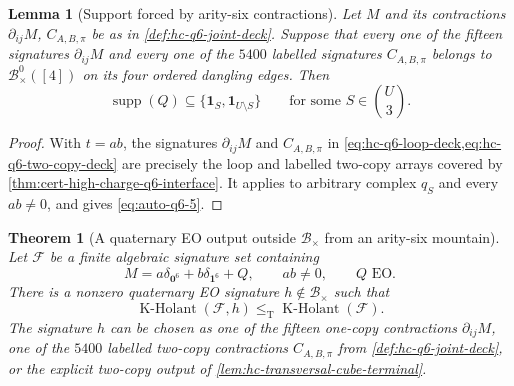 \documentclass[11pt,letterpaper,onecolumn]{article}
\theoremstyle{plain}
\newtheorem{theorem}{Theorem}[section]
\newtheorem{lemma}[lemma]{Lemma}
\theoremstyle{definition}
\theoremstyle{remark}
\newcommand{\cF}{\mathcal F}
\newcommand{\KHolant}{\operatorname{K\text{-}Holant}}
\newcommand{\one}{\mathbf 1}
\newcommand{\zero}{\mathbf 0}
\newcommand{\leT}{\leq_{\mathrm T}}
\begin{document}
	\begin{lemma}[Support forced by arity-six contractions]
		\label{lem:hc-q6-joint-rigidity}
		Let \(M\) and its contractions \(\partial_{ij}M\), \(C_{A,B,\pi}\) be as in
		\cref{def:hc-q6-joint-deck}.  Suppose that every one of the fifteen
		signatures \(\partial_{ij}M\) and every one of the \(5400\) labelled
		signatures \(C_{A,B,\pi}\) belongs to
		\(\mathcal B_\times^0([4])\) on its four ordered dangling edges.  Then
		\begin{equation}
		\operatorname{supp}(Q)\subseteq\{\one_S,\one_{U\setminus S}\}
		\qquad\text{for some }S\in\binom U3.
		\label{eq:auto-q6-5}
		\end{equation}
	\end{lemma}
	
	\begin{proof}
		With \(t=ab\), the signatures \(\partial_{ij}M\) and \(C_{A,B,\pi}\) in
		\cref{eq:hc-q6-loop-deck,eq:hc-q6-two-copy-deck} are precisely the loop
		and labelled two-copy arrays covered by
		\cref{thm:cert-high-charge-q6-interface}.  It applies to arbitrary complex \(q_S\)
        and every \(ab\ne0\), and gives \eqref{eq:auto-q6-5}.
	\end{proof}
	
	\begin{theorem}[A quaternary EO output outside \(\mathcal B_\times\) from an arity-six mountain]
		\label{thm:hc-q6-complete}
		Let \(\cF\) be a finite algebraic signature set containing
		\[
		M=a\delta_{\zero^6}+b\delta_{\one^6}+Q,
		\qquad ab\ne0,
		\qquad Q\text{ EO}.
		\]
		There is a nonzero quaternary EO signature
		\(h\notin\mathcal B_\times\) such that
		\[
		\KHolant(\cF,h)\leT\KHolant(\cF).
		\]
		The signature \(h\) can be chosen as one of the fifteen one-copy contractions
		\(\partial_{ij}M\), one of the \(5400\) labelled two-copy contractions
		\(C_{A,B,\pi}\) from \cref{def:hc-q6-joint-deck}, or the explicit
		two-copy output of \cref{lem:hc-transversal-cube-terminal}.
	\end{theorem}
	
\end{document}
